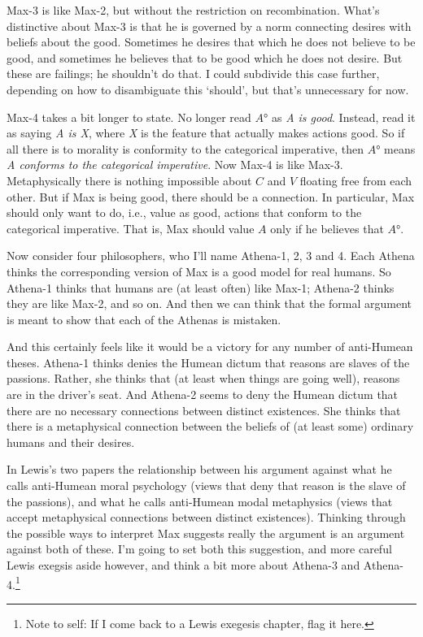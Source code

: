\documentclass[11pt,]{book}
\let\rmarkdownfootnote\footnote%
\def\footnote{\protect\rmarkdownfootnote}
\begin{document}
Max-3 is like Max-2, but without the restriction on recombination. What's distinctive about Max-3 is that he is governed by a norm connecting desires with beliefs about the good. Sometimes he desires that which he does not believe to be good, and sometimes he believes that to be good which he does not desire. But these are failings; he shouldn't do that. I could subdivide this case further, depending on how to disambiguate this `should', but that's unnecessary for now.

Max-4 takes a bit longer to state. No longer read \(A°\) as \emph{A is good}. Instead, read it as saying \emph{A is X}, where \emph{X} is the feature that actually makes actions good. So if all there is to morality is conformity to the categorical imperative, then \(A°\) means \emph{A conforms to the categorical imperative}. Now Max-4 is like Max-3. Metaphysically there is nothing impossible about \(C\) and \(V\) floating free from each other. But if Max is being good, there should be a connection. In particular, Max should only want to do, i.e., value as good, actions that conform to the categorical imperative. That is, Max should value \(A\) only if he believes that \(A°\).

Now consider four philosophers, who I'll name Athena-1, 2, 3 and 4. Each Athena thinks the corresponding version of Max is a good model for real humans. So Athena-1 thinks that humans are (at least often) like Max-1; Athena-2 thinks they are like Max-2, and so on. And then we can think that the formal argument is meant to show that each of the Athenas is mistaken.

And this certainly feels like it would be a victory for any number of anti-Humean theses. Athena-1 thinks denies the Humean dictum that reasons are slaves of the passions. Rather, she thinks that (at least when things are going well), reasons are in the driver's seat. And Athena-2 seems to deny the Humean dictum that there are no necessary connections between distinct existences. She thinks that there is a metaphysical connection between the beliefs of (at least some) ordinary humans and their desires.

In Lewis's two papers the relationship between his argument against what he calls anti-Humean moral psychology (views that deny that reason is the slave of the passions), and what he calls anti-Humean modal metaphysics (views that accept metaphysical connections between distinct existences). Thinking through the possible ways to interpret Max suggests really the argument is an argument against both of these. I'm going to set both this suggestion, and more careful Lewis exegsis aside however, and think a bit more about Athena-3 and Athena-4.\footnote{Note to self: If I come back to a Lewis exegesis chapter, flag it here.}
\end{document}

